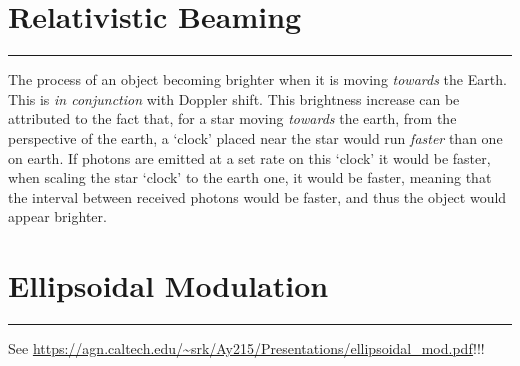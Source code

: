 \pagebreak
\section{Relativistic Beaming}\label{sec:RelBeaming}
\hrule
\vspace{.5cm}

The process of an object becoming brighter when it is moving \textit{towards} the Earth. This is \textit{in conjunction} with Doppler shift. This brightness increase can be attributed to the fact that, for a star moving \textit{towards} the earth, from the perspective of the earth, a `clock' placed near the star would run \textit{faster} than one on earth. If photons are emitted at a set rate on this `clock' it would be faster, when scaling the star `clock' to the earth one, it would be faster, meaning that the interval between received photons would be faster, and thus the object would appear brighter.  

\section{Ellipsoidal Modulation}
\label{sec:ellipsoidalModulation}
\hrule
\vspace{.5cm}
See \url{https://agn.caltech.edu/~srk/Ay215/Presentations/ellipsoidal_mod.pdf}!!!


